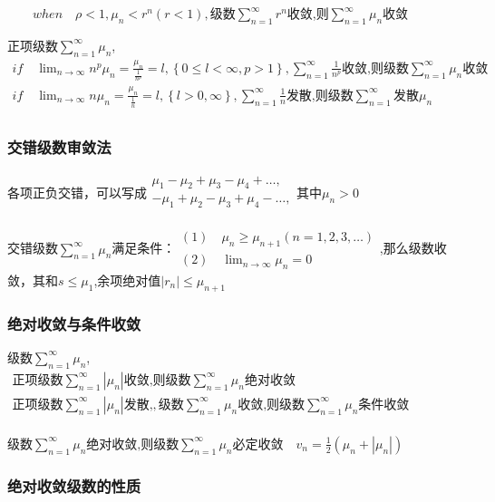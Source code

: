 \documentclass[UTF8]{ctexart}
\newcommand{\mt}[1]{\text{#1}}
\newcommand{\md}[1]{\displaystyle{#1}}
\newcommand{\mda}[1]{$\displaystyle{ #1 }$}
\newcommand{\mf}[1]{\left( #1\right)}
\newcommand{\mfa}[1]{\left| #1\right|}
\newcommand{\mfb}[1]{\left\{ #1\right\}}
\newcommand{\q}{\quad}
\newcommand{\ma}[1]{\begin{array}{llll} #1 \end{array}}
\begin{document}
$\q \q when \q \rho<1,\mu_n < r^n \mf{r<1},\mt{级数}\md{\sum_{n=1}^{ \infty}r^n}$收敛,则\mda{\sum_{n=1}^\infty\mu_n}收敛

正项级数\mda{\sum_{n=1}^\infty\mu_n},\mda{\ma{
    if \q \lim_{n \rightarrow \infty}n^p\mu_n=\frac{\mu_n}{\frac{1}{n^p}}=l,\mfb{0\leqslant l<\infty,p>1} ,\sum_{n=1}^\infty \frac{1}{n^p}  \mt{收敛,则级数} \sum_{n=1}^\infty \mu_n\mt{收敛}\\
    if \q \lim_{n \rightarrow \infty}n\mu_n=\frac{\mu_n}{\frac{1}{n}}=l,\mfb{l>0,\infty} ,\sum_{n=1}^\infty \frac{1}{n} \mt{发散,则级数}\sum_{n=1}^\infty \mt{发散}\mu_n\\
}}



\subsubsection{交错级数审敛法}

各项正负交错，可以写成\mda{\ma{\mu_1 -\mu_2  +\mu_3  -\mu_4 +\dots,\\
-\mu_1 +\mu_2  -\mu_3  +\mu_4 -\dots,\\
}}其中\mda{\mu_n>0}


交错级数\mda{\sum_{n=1}^\infty\mu_n}满足条件：\mda{\ma{
    (1) \q  \mu_n \geqslant \mu_{n+1} \mf{n=1,2,3,\dots}\\
    (2) \q  \lim_{n \rightarrow \infty}\mu_n=0}
},那么级数收敛，其和\mda{s\leqslant \mu_1},余项绝对值\mda{\mfa{r_n}\leqslant \mu_{n+1}}


\subsubsection{绝对收敛与条件收敛}


级数\mda{\sum_{n=1}^\infty\mu_n}, \mda{\ma{
   \mt{正项级数} \sum_{n=1}^\infty \mfa{\mu_n} \mt{收敛,则级数} \sum_{n=1}^\infty\mu_n \mt{绝对收敛}\\
   \mt{正项级数} \sum_{n=1}^\infty \mfa{\mu_n} \mt{发散,},\mt{级数} \sum_{n=1}^\infty \mu_n \mt{收敛,则级数} \sum_{n=1}^\infty\mu_n \mt{条件收敛}\\
}}

$\mt{级数} \sum_{n=1}^\infty  \mu_n \mt{绝对收敛,则级数} \sum_{n=1}^\infty\mu_n \mt{必定收敛} \q v_n=\frac{1}{2}\mf{\mu_n+\mfa{\mu_n}}$


\subsubsection{绝对收敛级数的性质}
\end{document}
